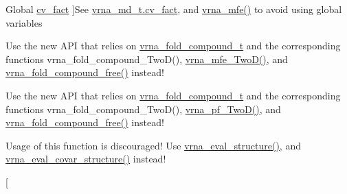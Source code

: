 \begin{DoxyRefList}
Global \hyperlink{group__consensus__fold_gaf3cbac6ff5d706d6e414677841ddf94c}{cv\-\_\-fact} ]See \hyperlink{group__model__details_a62ebefb9d0643e5c4c8a2ec84a105ce6}{vrna\-\_\-md\-\_\-t.\-cv\-\_\-fact}, and \hyperlink{group__mfe__fold_gabd3b147371ccf25c577f88bbbaf159fd}{vrna\-\_\-mfe()} to avoid using global variables 
\item[\label{deprecated__deprecated000003}%
\hypertarget{deprecated__deprecated000003}{}%
Global \hyperlink{group__kl__neighborhood__mfe_ga05bf4f31d216b1b160fd2d3d68e9b487}{destroy\-\_\-\-Two\-Dfold\-\_\-variables} (\hyperlink{group__kl__neighborhood__mfe_structTwoDfold__vars}{Two\-Dfold\-\_\-vars} $\ast$our\-\_\-variables)]Use the new A\-P\-I that relies on \hyperlink{group__fold__compound_ga1b0cef17fd40466cef5968eaeeff6166}{vrna\-\_\-fold\-\_\-compound\-\_\-t} and the corresponding functions vrna\-\_\-fold\-\_\-compound\-\_\-\-Two\-D(), \hyperlink{group__kl__neighborhood__mfe_ga243c288b463147352829df04de6a2f77}{vrna\-\_\-mfe\-\_\-\-Two\-D()}, and \hyperlink{group__fold__compound_gadded6039d63f5d6509836e20321534ad}{vrna\-\_\-fold\-\_\-compound\-\_\-free()} instead! 
\item[\label{deprecated__deprecated000008}%
\hypertarget{deprecated__deprecated000008}{}%
Global \hyperlink{2Dpfold_8h_afe994291458ee2ac34d3eb825ef62a15}{destroy\-\_\-\-Two\-Dpfold\-\_\-variables} (\hyperlink{structTwoDpfold__vars}{Two\-Dpfold\-\_\-vars} $\ast$vars)]Use the new A\-P\-I that relies on \hyperlink{group__fold__compound_ga1b0cef17fd40466cef5968eaeeff6166}{vrna\-\_\-fold\-\_\-compound\-\_\-t} and the corresponding functions vrna\-\_\-fold\-\_\-compound\-\_\-\-Two\-D(), \hyperlink{group__kl__neighborhood__pf_ga0bc3427689bd09da09b8b3094a27f836}{vrna\-\_\-pf\-\_\-\-Two\-D()}, and \hyperlink{group__fold__compound_gadded6039d63f5d6509836e20321534ad}{vrna\-\_\-fold\-\_\-compound\-\_\-free()} instead! 
\item[\label{deprecated__deprecated000015}%
\hypertarget{deprecated__deprecated000015}{}%
Global \hyperlink{group__consensus__fold_ga1c48869c03b49a342bf4cbdd61900081}{energy\-\_\-of\-\_\-alistruct} (const char $\ast$$\ast$sequences, const char $\ast$structure, int n\-\_\-seq, float $\ast$energy)]Usage of this function is discouraged! Use \hyperlink{group__eval_ga58f199f1438d794a265f3b27fc8ea631}{vrna\-\_\-eval\-\_\-structure()}, and \hyperlink{group__eval_ga6cea75c0eb9857fb59172be54cab09e0}{vrna\-\_\-eval\-\_\-covar\-\_\-structure()} instead! 
\item[\label{deprecated__deprecated000060}%
\hypertarget{deprecated__deprecated000060}{}%
$$
\end{DoxyRefList}

